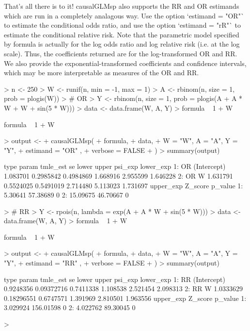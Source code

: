 \documentclass{article}
\begin{document}
 
 
That's all there is to it! causalGLMsp also supports the RR and OR estimands which are run in a completely analagous way. Use the option `estimand = "OR"` to estimate the conditional odds ratio, and use the option `estimand = "rR"` to estimate the conditional relative risk. Note that the parametric model specified by formula is actually for the log odds ratio and log relative risk (i.e. at the log scale). Thus, the coefficients returned are for the log-transformed OR and RR. We also provide the exponential-transformed coefficients and confidence intervals, which may be more interpretable as measures of the OR and RR.

\begin{Schunk}
\begin{Sinput}
> n <- 250
> W <- runif(n, min = -1,  max = 1)
> A <- rbinom(n, size = 1, prob = plogis(W))
> # OR
> Y <- rbinom(n, size =  1, prob = plogis(A + A * W + W + sin(5 * W)))
> data <- data.frame(W, A, Y)
> formula ~ 1 + W
\end{Sinput}
\begin{Soutput}
formula ~ 1 + W
\end{Soutput}
\begin{Sinput}
> output <-
+   causalGLMsp(
+     formula,
+     data,
+     W = "W", A = "A", Y = "Y",
+     estimand = "OR" ,
+     verbose = FALSE
+   )
> summary(output)
\end{Sinput}
\begin{Soutput}
   type       param tmle_est        se     lower    upper  psi_exp lower_exp
1:   OR (Intercept) 1.083701 0.2985842 0.4984869 1.668916 2.955599  1.646228
2:   OR           W 1.631791 0.5524025 0.5491019 2.714480 5.113023  1.731697
   upper_exp  Z_score p_value
1:   5.30641 57.38689       0
2:  15.09675 46.70667       0
\end{Soutput}
\begin{Sinput}
> # RR
> Y <- rpois(n, lambda = exp(A + A * W + sin(5 * W)))
> data <- data.frame(W, A, Y)
> formula ~ 1 + W
\end{Sinput}
\begin{Soutput}
formula ~ 1 + W
\end{Soutput}
\begin{Sinput}
> output <-
+   causalGLMsp(
+     formula,
+     data,
+     W = "W", A = "A", Y = "Y",
+     estimand = "RR" ,
+     verbose = FALSE
+   )
> summary(output)
\end{Sinput}
\begin{Soutput}
   type       param  tmle_est         se     lower    upper  psi_exp lower_exp
1:   RR (Intercept) 0.9248356 0.09372716 0.7411338 1.108538 2.521454  2.098313
2:   RR           W 1.0333629 0.18296551 0.6747571 1.391969 2.810501  1.963556
   upper_exp   Z_score p_value
1:  3.029924 156.01598       0
2:  4.022762  89.30045       0
\end{Soutput}
\begin{Sinput}
> 
\end{Sinput}
\end{Schunk}
\end{document}
